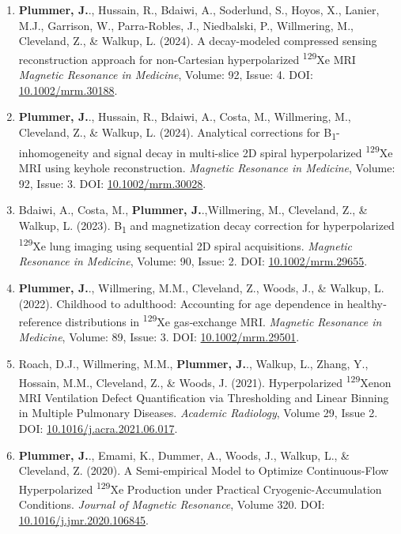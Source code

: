 \documentclass[12pt,]{scrartcl}
\begin{document}
\begin{enumerate}
    \item  \textbf{Plummer, J.}., Hussain, R., Bdaiwi, A., Soderlund, S., Hoyos, X., Lanier, M.J., Garrison, W., Parra-Robles, J., Niedbalski, P., Willmering, M., Cleveland, Z., \& Walkup, L. (2024). A decay-modeled compressed sensing reconstruction approach for non-Cartesian hyperpolarized \textsuperscript{129}Xe MRI \textit{Magnetic Resonance in Medicine}, Volume: 92, Issue: 4.
    DOI: \href{https://doi.org/10.1002/mrm.30188}{10.1002/mrm.30188}.

    \item  \textbf{Plummer, J.}., Hussain, R., Bdaiwi, A., Costa, M., Willmering, M., Cleveland, Z., \& Walkup, L. (2024). Analytical corrections for B\textsubscript{1}-inhomogeneity and signal decay in multi-slice 2D spiral hyperpolarized \textsuperscript{129}Xe MRI using keyhole reconstruction. \textit{Magnetic Resonance in Medicine}, Volume: 92, Issue: 3. 
    DOI: \href{https://doi.org/10.1002/mrm.30028}{10.1002/mrm.30028}.
    
    \item  Bdaiwi, A., Costa, M., \textbf{Plummer, J.}.,Willmering, M., Cleveland, Z., \& Walkup, L. (2023). B\textsubscript{1} and magnetization decay correction for hyperpolarized \textsuperscript{129}Xe lung imaging using sequential 2D spiral acquisitions. \textit{Magnetic Resonance in Medicine}, Volume: 90, Issue: 2. DOI: \href{ https://doi.org/10.1002/mrm.29655}{ 10.1002/mrm.29655}.
    
    \item \textbf{Plummer, J.}., Willmering, M.M., Cleveland, Z., Woods, J., \& Walkup, L. (2022). Childhood to adulthood: Accounting for age dependence in healthy‐reference distributions in \textsuperscript{129}Xe gas‐exchange MRI. \textit{Magnetic Resonance in Medicine}, Volume: 89, Issue: 3. DOI: \href{https://onlinelibrary.wiley.com/share/GVTXYDIF3Y2VPZRHQRIK?target=10.1002/mrm.29501}{10.1002/mrm.29501}.
    
    \item Roach, D.J., Willmering, M.M., \textbf{Plummer, J.}., Walkup, L., Zhang, Y., Hossain, M.M., Cleveland, Z., \& Woods, J. (2021). Hyperpolarized \textsuperscript{129}Xenon MRI Ventilation Defect Quantification via Thresholding and Linear Binning in Multiple Pulmonary Diseases. \textit{Academic Radiology}, Volume 29, Issue 2. DOI: \href{https://doi.org/10.1016/j.acra.2021.06.017}{10.1016/j.acra.2021.06.017}.
    
    \item \textbf{Plummer, J.}., Emami, K., Dummer, A., Woods, J., Walkup, L., \& Cleveland, Z. (2020). A Semi-empirical Model to Optimize Continuous-Flow Hyperpolarized \textsuperscript{129}Xe Production under Practical Cryogenic-Accumulation Conditions. \textit{Journal of Magnetic Resonance}, Volume 320. DOI: \href{https://doi.org/10.1016/j.jmr.2020.106845}{10.1016/j.jmr.2020.106845}.

\end{enumerate}
\end{document}
